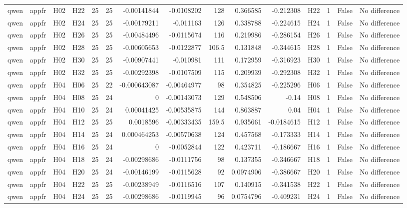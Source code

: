 \begin{longtable}{llllrrrrrrrlrrl}
qwen & appfr & H02 & H22 & 25 & 25 & -0.00141844 & -0.0108202 & 128 & 0.366585 & -0.212308 & H22 & 1 & False & No difference \\
qwen & appfr & H02 & H24 & 25 & 25 & -0.00179211 & -0.011163 & 126 & 0.338788 & -0.224615 & H24 & 1 & False & No difference \\
qwen & appfr & H02 & H26 & 25 & 25 & -0.00484496 & -0.0115674 & 116 & 0.219986 & -0.286154 & H26 & 1 & False & No difference \\
qwen & appfr & H02 & H28 & 25 & 25 & -0.00605653 & -0.0122877 & 106.5 & 0.131848 & -0.344615 & H28 & 1 & False & No difference \\
qwen & appfr & H02 & H30 & 25 & 25 & -0.00907441 & -0.010981 & 111 & 0.172959 & -0.316923 & H30 & 1 & False & No difference \\
qwen & appfr & H02 & H32 & 25 & 25 & -0.00292398 & -0.0107509 & 115 & 0.209939 & -0.292308 & H32 & 1 & False & No difference \\
qwen & appfr & H04 & H06 & 25 & 22 & -0.000643087 & -0.00464977 & 98 & 0.354825 & -0.225296 & H06 & 1 & False & No difference \\
qwen & appfr & H04 & H08 & 25 & 24 & 0 & -0.00143073 & 129 & 0.548506 & -0.14 & H08 & 1 & False & No difference \\
qwen & appfr & H04 & H10 & 25 & 24 & 0.00041425 & -0.00535875 & 144 & 0.863887 & 0.04 & H04 & 1 & False & No difference \\
qwen & appfr & H04 & H12 & 25 & 25 & 0.0018596 & -0.00333435 & 159.5 & 0.935661 & -0.0184615 & H12 & 1 & False & No difference \\
qwen & appfr & H04 & H14 & 25 & 24 & 0.000464253 & -0.00570638 & 124 & 0.457568 & -0.173333 & H14 & 1 & False & No difference \\
qwen & appfr & H04 & H16 & 25 & 24 & 0 & -0.0052844 & 122 & 0.423711 & -0.186667 & H16 & 1 & False & No difference \\
qwen & appfr & H04 & H18 & 25 & 24 & -0.00298686 & -0.0111756 & 98 & 0.137355 & -0.346667 & H18 & 1 & False & No difference \\
qwen & appfr & H04 & H20 & 25 & 24 & -0.00146199 & -0.0115628 & 92 & 0.0974906 & -0.386667 & H20 & 1 & False & No difference \\
qwen & appfr & H04 & H22 & 25 & 25 & -0.00238949 & -0.0116516 & 107 & 0.140915 & -0.341538 & H22 & 1 & False & No difference \\
qwen & appfr & H04 & H24 & 25 & 25 & -0.00298686 & -0.0119945 & 96 & 0.0754796 & -0.409231 & H24 & 1 & False & No difference \\

\end{longtable}
